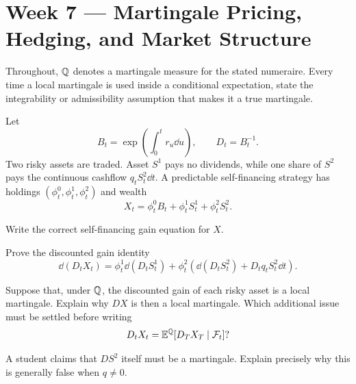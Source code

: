\section{Week 7 --- Martingale Pricing, Hedging, and Market Structure}

Throughout, \(\mathbb Q\) denotes a martingale measure for the stated numeraire.
Every time a local martingale is used inside a conditional expectation,
state the integrability or admissibility assumption that makes it a true
martingale.

\ifIncludeCore

\setcounter{exercise}{0}
\begin{exercise}
Let
\[
B_t=\exp\left(\int_0^t r_u\dd u\right),
\qquad D_t=B_t^{-1}.
\]
Two risky assets are traded. Asset \(S^1\) pays no dividends, while one share
of \(S^2\) pays the continuous cashflow \(q_tS_t^2\dd t\). A predictable
self-financing strategy has holdings
\((\phi_t^0,\phi_t^1,\phi_t^2)\) and wealth
\[
X_t=\phi_t^0B_t+\phi_t^1S_t^1+\phi_t^2S_t^2.
\]
\begin{exparts}
  \item Write the correct self-financing gain equation for \(X\).
  \item Prove the discounted gain identity
  \[
  \dd(D_tX_t)
  =\phi_t^1\dd(D_tS_t^1)
  +\phi_t^2\left(\dd(D_tS_t^2)+D_tq_tS_t^2\dd t\right).
  \]
  \item Suppose that, under \(\mathbb Q\), the discounted gain of each risky
  asset is a local martingale. Explain why \(DX\) is then a local martingale.
  Which additional issue must be settled before writing
  \[
  D_tX_t=\mathbb E^{\mathbb Q}[D_TX_T\mid\mathcal F_t]?
  \]
  \item A student claims that \(DS^2\) itself must be a martingale. Explain
  precisely why this is generally false when \(q\neq0\).
\end{exparts}
\end{exercise}

